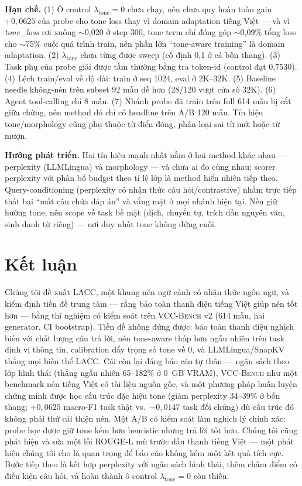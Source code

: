 \documentclass[runningheads]{llncs}
\newcommand{\tone}[1]{\textit{#1}}
\newcommand{\method}[1]{\textsc{#1}}
\begin{document}
\textbf{Hạn chế.} (1) Ô control $\lambda_{\text{tone}}{=}0$ chưa chạy, nên chưa quy hoàn toàn gain $+0{,}0625$ của probe cho tone loss thay vì domain adaptation tiếng Việt --- và vì \tone{tone\_loss} rơi xuống $\sim$0,020 ở step 300, tone term chỉ đóng góp $\sim$0,09\% tổng loss cho $\sim$75\% cuối quá trình train, nên phần lớn ``tone-aware training'' là domain adaptation. (2) $\lambda_{\text{tone}}$ chưa từng được sweep (cố định 0,1 ở cả bốn thang). (3) Task phụ của probe giải được tầm thường bằng tra token-id (control đạt 0,7530). (4) Lệch train/eval về độ dài: train ở seq 1024, eval ở 2K--32K. (5) Baseline needle không-nén trên subset 92 mẫu dễ hơn (28/120 vượt cửa sổ 32K). (6) Agent tool-calling chỉ 8 mẫu. (7) Nhánh probe đã train trên full 614 mẫu bị cắt giữa chừng, nên method đó chỉ có headline trên A/B 120 mẫu. Tín hiệu tone/morphology cũng phụ thuộc từ điển đóng, phân loại sai từ mới hoặc từ mượn.

\textbf{Hướng phát triển.} Hai tín hiệu mạnh nhất nằm ở hai method khác nhau --- perplexity (LLMLingua) và morphology --- và chưa ai đo cùng nhau; scorer perplexity với phân bổ budget theo tỉ lệ lớp là method hiển nhiên tiếp theo. Query-conditioning (perplexity có nhận thức câu hỏi/contrastive) nhắm trực tiếp thất bại ``mất câu chứa đáp án'' và vắng mặt ở mọi nhánh hiện tại. Nếu giữ hướng tone, nên scope về task bề mặt (dịch, chuyển tự, trích dẫn nguyên văn, sinh danh từ riêng) --- nơi duy nhất tone không đứng cuối.


\section{Kết luận}

Chúng tôi đề xuất \method{LACC}, một khung nén ngữ cảnh có nhận thức ngôn ngữ, và kiểm định tiền đề trung tâm --- rằng bảo toàn thanh điệu tiếng Việt giúp nén tốt hơn --- bằng thí nghiệm có kiểm soát trên \method{VCC-Bench} v2 (614 mẫu, hai generator, CI bootstrap). Tiền đề không đứng được: bảo toàn thanh điệu nghịch biến với chất lượng câu trả lời, nén tone-aware thấp hơn ngẫu nhiên trên task định vị thông tin, calibration đẩy trọng số tone về 0, và LLMLingua/SnapKV thắng mọi biến thể \method{LACC}. Cái còn lại đáng báo cáo tự thân --- ngân sách theo lớp hình thái (thắng ngẫu nhiên 65--182\% ở 0~GB VRAM), \method{VCC-Bench} như một benchmark nén tiếng Việt có tài liệu nguồn gốc, và một phương pháp huấn luyện chứng minh được học cấu trúc đặc hiệu tone (giảm perplexity 34--39\% ở bốn thang; $+0{,}0625$ macro-F1 task thật vs.\ $-0{,}0147$ task đối chứng) dù cấu trúc đó không phải thứ cải thiện nén. Một A/B có kiểm soát làm nghịch lý chính xác: probe học được giữ tone kém hơn heuristic nhưng trả lời tốt hơn. Chúng tôi cũng phát hiện và sửa một lỗi ROUGE-L mù trước dấu thanh tiếng Việt --- một phát hiện chúng tôi cho là quan trọng để báo cáo không kém một kết quả tích cực. Bước tiếp theo là kết hợp perplexity với ngân sách hình thái, thêm chấm điểm có điều kiện câu hỏi, và hoàn thành ô control $\lambda_{\text{tone}}{=}0$ còn thiếu.
\end{document}
